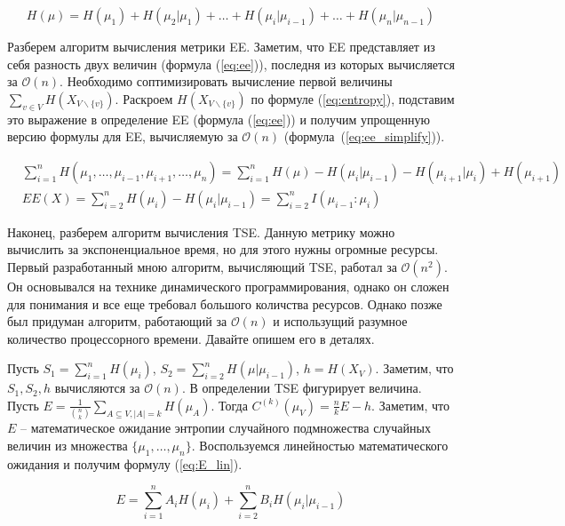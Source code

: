 \documentclass{spbau-diploma}
\begin{document}
\begin{equation} \label{eq:entropy}
H(\mu) = H(\mu_1) + H(\mu_2|\mu_1) + \ldots + H(\mu_i|\mu_{i-1}) + \ldots + H(\mu_n|\mu_{n-1})
\end{equation}

Разберем алгоритм вычисления метрики EE. Заметим, что EE представляет из себя разность двух величин (формула (\ref{eq:ee})), последня из которых вычисляется за $\mathcal{O}(n)$. Необходимо соптимизировать вычисление первой величины $\sum\limits_{v\in V}H(X_{V\backslash\{v\}})$. Раскроем $H(X_{V\backslash\{v\}})$ по формуле (\ref{eq:entropy}), подставим это выражение в определение EE (формула (\ref{eq:ee})) и получим упрощенную версию формулы для EE, вычисляемую за $\mathcal{O}(n)$ (формула~(\ref{eq:ee_simplify})).

\begin{equation} \label{eq:ee_simplify}
\begin{split}
& \sum\limits_{i=1}^{n}H(\mu_1,\ldots,\mu_{i-1},\mu_{i+1},\ldots,\mu_n) =
\sum\limits_{i=1}^{n}H(\mu) - H(\mu_i|\mu_{i-1}) - H(\mu_{i+1}|\mu_i) + H(\mu_{i+1}) \\
& EE(X) = \sum\limits_{i=2}^{n}H(\mu_i) - H(\mu_i|\mu_{i-1})= \sum\limits_{i=2}^{n}I(\mu_{i-1}\colon\mu_i)
\end{split}
\end{equation}

Наконец, разберем алгоритм вычисления TSE. Данную метрику можно вычислить за экспоненциальное время, но для этого нужны огромные ресурсы. Первый разработанный мною алгоритм, вычисляющий TSE, работал за $\mathcal{O}(n^2)$. Он основывался на технике динамического программирования, однако он сложен для понимания и все еще требовал большого количства ресурсов. Однако позже был придуман алгоритм, работающий за $\mathcal{O}(n)$ и использущий разумное количество процессорного времени. Давайте опишем его в деталях.

Пусть $S_1 = \sum\limits_{i=1}^{n}H(\mu_i)$, $S_2 = \sum\limits_{i=2}^{n}H(\mu|\mu_{i-1})$, $h = H(X_V)$. Заметим, что $S_1,S_2,h$ вычисляются за $\mathcal{O}(n)$. В определении TSE фигурирует величина. Пусть $E = \frac{1}{\binom{n}{k}}\sum\limits_{A\subseteq V,|A|=k}H(\mu_A)$. Тогда $C^{(k)}(\mu_V) = \frac{n}{k}E - h$. Заметим, что $E$ -- математическое ожидание энтропии случайного подмножества случайных величин из множества $\{\mu_1,\ldots,\mu_n\}$. Воспользуемся линейностью математического ожидания и получим формулу (\ref{eq:E_lin}).

\begin{equation} \label{eq:E_lin}
E = \sum\limits_{i=1}^{n}A_iH(\mu_i) + \sum\limits_{i=2}^{n}B_iH(\mu_i|\mu_{i-1})
\end{equation}
\end{document}
